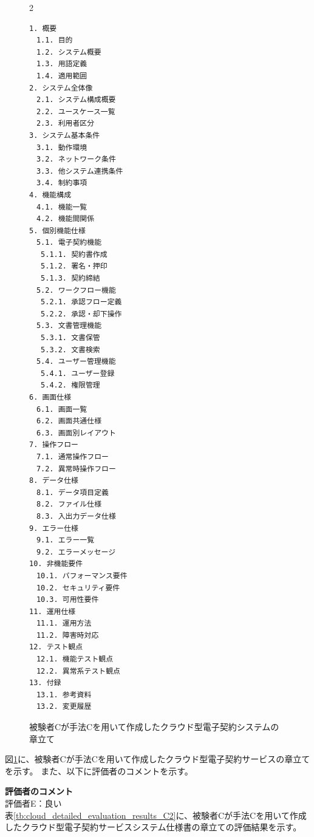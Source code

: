 \begin{figure}[tp]
\begin{tcolorbox}[
  colback=white,
  colframe=orange,
  fonttitle=\bfseries
]
\begin{multicols}{2}
\footnotesize
\ttfamily
\fontsize{8}{9}\selectfont
\begin{verbatim}
1. 概要
　1.1. 目的
　1.2. システム概要
　1.3. 用語定義
　1.4. 適用範囲
2. システム全体像
　2.1. システム構成概要
　2.2. ユースケース一覧
　2.3. 利用者区分
3. システム基本条件
　3.1. 動作環境
　3.2. ネットワーク条件
　3.3. 他システム連携条件
　3.4. 制約事項
4. 機能構成
　4.1. 機能一覧
　4.2. 機能間関係
5. 個別機能仕様
　5.1. 電子契約機能
 　5.1.1. 契約書作成
 　5.1.2. 署名・押印
 　5.1.3. 契約締結
　5.2. ワークフロー機能
 　5.2.1. 承認フロー定義
 　5.2.2. 承認・却下操作
　5.3. 文書管理機能
 　5.3.1. 文書保管
 　5.3.2. 文書検索
　5.4. ユーザー管理機能
 　5.4.1. ユーザー登録
 　5.4.2. 権限管理
6. 画面仕様
　6.1. 画面一覧
　6.2. 画面共通仕様
　6.3. 画面別レイアウト
7. 操作フロー
　7.1. 通常操作フロー
　7.2. 異常時操作フロー
8. データ仕様
　8.1. データ項目定義
　8.2. ファイル仕様
　8.3. 入出力データ仕様
9. エラー仕様
　9.1. エラー一覧
　9.2. エラーメッセージ
10. 非機能要件
　10.1. パフォーマンス要件
　10.2. セキュリティ要件
　10.3. 可用性要件
11. 運用仕様
　11.1. 運用方法
　11.2. 障害時対応
12. テスト観点
　12.1. 機能テスト観点
　12.2. 異常系テスト観点
13. 付録
　13.1. 参考資料
　13.2. 変更履歴
\end{verbatim}
\end{multicols}
\end{tcolorbox}
\caption{被験者Cが手法Cを用いて作成したクラウド型電子契約システムの章立て}
\label{fig:C_chapter_structure_of_cloud_contract_system_2}
\end{figure}


図\ref{fig:C_chapter_structure_of_cloud_contract_system_2}に、被験者Cが手法Cを用いて作成したクラウド型電子契約サービスの章立てを示す。
また、以下に評価者のコメントを示す。

\noindent\textbf{評価者のコメント}\\
評価者E：良い\\

表\ref{tb:cloud_detailed_evaluation_results_C2}に、被験者Cが手法Cを用いて作成したクラウド型電子契約サービスシステム仕様書の章立ての評価結果を示す。

